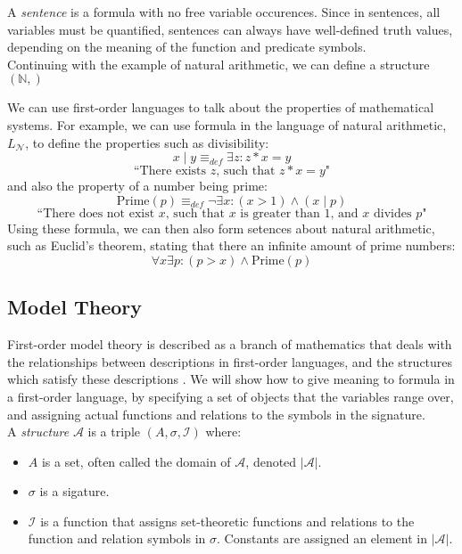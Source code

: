 \documentclass[12pt]{article}
\theoremstyle{definition}
\begin{document}
A \emph{sentence} is a formula with no free variable occurences.
Since in sentences, all variables must be quantified, sentences can always have well-defined truth values, depending on the meaning of the function and predicate symbols.\\

Continuing with the example of natural arithmetic, we can define a structure $(\mathbb{N}, )$

\noindent
We can use first-order languages to talk about the properties of mathematical systems.
For example, we can use formula in the language of natural arithmetic, $L_\mathcal{N}$, to define the properties such as divisibility:
$$x\mid y \equiv_{def} \exists z: z*x = y$$
$$\text{``There exists $z$, such that $z*x = y$"}$$
and also the property of a number being prime:
$$\text{Prime}(p) \equiv_{def} \neg\exists x: (x>1)\wedge(x\mid p)$$
$$\text{``There does not exist $x$, such that $x$ is greater than $1$, and $x$ divides $p$"}$$
Using these formula, we can then also form setences about natural arithmetic, such as Euclid's theorem, stating that there an infinite amount of prime numbers:
$$\forall x \exists p: (p>x)\wedge\text{Prime}(p)$$

\subsection{Model Theory}
First-order model theory is described as a branch of mathematics that deals with the relationships between descriptions in first-order languages, and the structures which satisfy these descriptions \cite{stanmodel}.
We will show how to give meaning to formula in a first-order language, by specifying a set of objects that the variables range over, and assigning actual functions and relations to the symbols in the signature.\\

\noindent
A \emph{structure} $\mathcal{A}$ is a triple $(A, \sigma,\mathcal{I})$ where:
\begin{itemize}
  \item $A$ is a set, often called the domain of $\mathcal{A}$, denoted $|\mathcal{A}|$.
  \item $\sigma$ is a sigature.
  \item $\mathcal I$ is a function that assigns set-theoretic functions and relations to the function and relation symbols in $\sigma$. Constants are assigned an element in $|\mathcal{A}|$.
\end{itemize}
\end{document}
